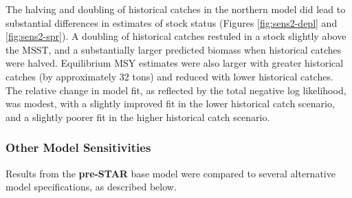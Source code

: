 \documentclass[11pt,
  english,
]{article}
\begin{document}
The halving and doubling of historical catches in the northern model did lead to substantial differences in estimates of stock status (Figures \ref{fig:sens2-depl} and \ref{fig:sens2-spr}). A doubling of historical catches restuled in a stock slightly above the MSST, and a substantially larger predicted biomass when historical catches were halved. Equilibrium MSY estimates were also larger with greater historical catches (by approximately 32 tons) and reduced with lower historical catches. The relative change in model fit, as reflected by the total negative log likelihood, was modest, with a slightly improved fit in the lower historical catch scenario, and a slightly poorer fit in the higher historical catch scenario.


\hypertarget{other-model-sensitivities}{%
\subsubsection{Other Model Sensitivities}\label{other-model-sensitivities}}

\leavevmode\tagmcend\tagstructend

Results from the \textbf{pre-STAR} base model were compared to several alternative model specifications, as described below.

\end{document}
